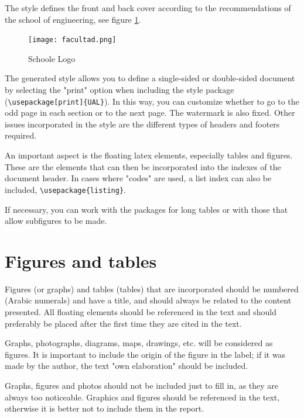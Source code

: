 The style defines the front and back cover according to the recommendations of the school of engineering, see figure \ref{fig:facultad}.

\begin{figure}
	\begin{center}
		\texttt{[image: facultad.png]}
	\end{center}
	\caption{\label{fig:facultad} Schoole Logo }
\end{figure}



The generated style allows you to define a single-sided or double-sided document by selecting the "print" option when including the style package (\lstinline[language=enparrafo]!\usepackage[print]{UAL}!). In this way, you can customize whether to go to the odd page in each section or to the next page.
The watermark is also fixed. Other issues incorporated in the style are the different types of headers and footers required.

An important aspect is the floating latex elements, especially tables and figures. These are the elements that can then be incorporated into the indexes of the document header. In cases where "codes" are used, a list index can also be included, \lstinline[language=enparrafo]!\usepackage{listing}!.

If necessary, you can work with the packages for long tables or with those that allow subfigures to be made.

 \section{Figures and tables}

Figures (or graphs) and tables (tables) that are incorporated should be numbered (Arabic numerals) and have a title, and should always be related to the content presented.  All floating elements should be referenced in the text and should preferably be placed after the first time they are cited in the text.

Graphs, photographs, diagrams, maps, drawings, etc. will be considered as figures. It is important to include the origin of the figure in the label; if it was made by the author, the text "own elaboration" should be included.

Graphs, figures and photos should not be included just to fill in, as they are always too noticeable. Graphics and figures should be referenced in the text, otherwise it is better not to include them in the report.



